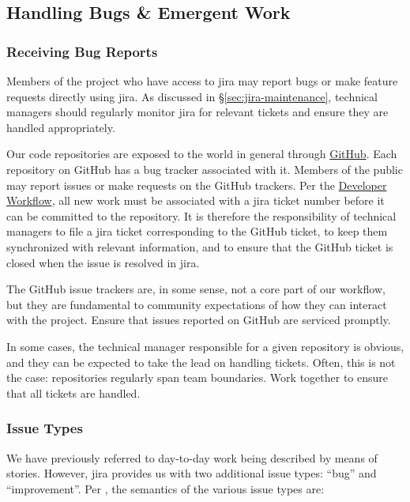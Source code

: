 \subsection{Handling Bugs \& Emergent Work}
\label{sec:bugs}

\subsubsection{Receiving Bug Reports}\label{receiving-bug-reports}

Members of the project who have access to \gls{jira} may report bugs or make feature requests directly using \gls{jira}.
As discussed in \S\ref{sec:jira-maintenance}, technical managers should regularly monitor \gls{jira} for relevant tickets and ensure they are handled appropriately.

Our code repositories are exposed to the world in general through \href{https://github.com/lsst/}{GitHub}.
Each repository on GitHub has a bug tracker associated with it.
Members of the public may report issues or make requests on the GitHub trackers.
Per the \href{https://developer.lsst.io/processes/workflow.html}{Developer Workflow}, all new work must be associated with a \gls{jira} ticket number before it can be committed to the repository.
It is therefore the responsibility of technical managers to file a \gls{jira} ticket corresponding to the GitHub ticket, to keep them synchronized with relevant information, and to ensure that the GitHub ticket is closed when the issue is resolved in \gls{jira}.

The GitHub issue trackers are, in some sense, not a core part of our
workflow, but they are fundamental to community expectations of how they
can interact with the project. Ensure that issues reported on GitHub are
serviced promptly.

In some cases, the technical manager responsible for a given repository
is obvious, and they can be expected to take the lead on handling
tickets. Often, this is not the case: repositories regularly span team
boundaries. Work together to ensure that all tickets are handled.

\subsubsection{Issue Types}\label{issue-types}

We have previously referred to day-to-day work being described by means of stories.
However, \gls{jira} provides us with two additional issue types: ``bug'' and ``improvement''.
Per , the semantics of the various issue types are:

